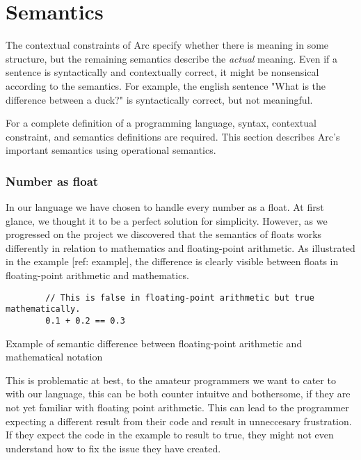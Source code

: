 \section{Semantics}\label{sec:languagesemantics}
The contextual constraints of Arc specify whether there is meaning in some structure, but the remaining semantics describe the \textit{actual} meaning. Even if a sentence is syntactically and contextually correct, it might be nonsensical according to the semantics. For example, the english sentence "What is the difference between a duck?" is syntactically correct, but not meaningful.

For a complete definition of a programming language, syntax, contextual constraint, and semantics definitions are required. This section describes Arc's important semantics using operational semantics.


\subsubsection{Number as float}\label{subsubsec:numberAsFloats}
In our language we have chosen to handle every number as a float. At first glance, we thought it to be a perfect solution for simplicity. However, as we progressed on the project we discovered that the semantics of floats works differently in relation to mathematics and floating-point arithmetic. As illustrated in the example [ref: example], the difference is clearly visible between floats in floating-point arithmetic and mathematics.


\begin{listing}[htb!]
    \begin{verbatim}
        // This is false in floating-point arithmetic but true mathematically.
        0.1 + 0.2 == 0.3
    \end{verbatim}
    \caption{Example of semantic difference between floating-point arithmetic and mathematical notation}
    \label{lst:semanticDifference}
\end{listing}


This is problematic at best, to the amateur programmers we want to cater to with our language, this can be both counter intuitve and bothersome, if they are not yet familiar with floating point arithmetic. This can lead to the programmer expecting a different result from their code and result in unneccesary frustration. If they expect the code in the example to result to true, they might not even understand how to fix the issue they have created.

